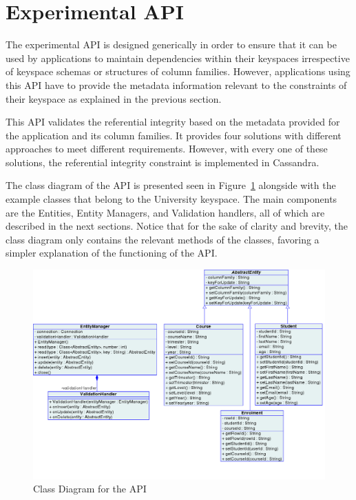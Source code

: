 \section{Experimental API}\label{s:implementation-API}

The experimental \ac{API} is designed generically in order to ensure
that it can be used by  applications to maintain dependencies within their
keyspaces irrespective of keyspace schemas or structures of column
families. However, applications using this \ac{API}  have to provide
 the metadata information relevant to the constraints of their keyspace as
 explained in the previous section. 

This \ac{API} validates the referential integrity based on the metadata provided
for the application and its column families.  It  provides  four solutions
with different approaches to meet different requirements. However, with 
 every one of these solutions,  the referential integrity constraint is
 implemented in Cassandra.

The  class diagram of the \ac{API} is presented seen in
 Figure~\ref{f:classDiagram} alongside with the example classes that belong to 
the University keyspace. The main components are the Entities, Entity Managers,
and Validation handlers, all of which are described in the next sections.  
 Notice that for the sake of clarity and brevity,  the class diagram only
 contains  the relevant  methods of the classes, favoring a simpler
explanation of the functioning of the \ac{API}.

\begin{figure}[h]   
	\centering
	\includegraphics[width=\textwidth]{./figure/Solutions/FinalClassDiagram.png}
	\caption{Class Diagram for the \ac{API}}\label{f:classDiagram}
\end{figure}


